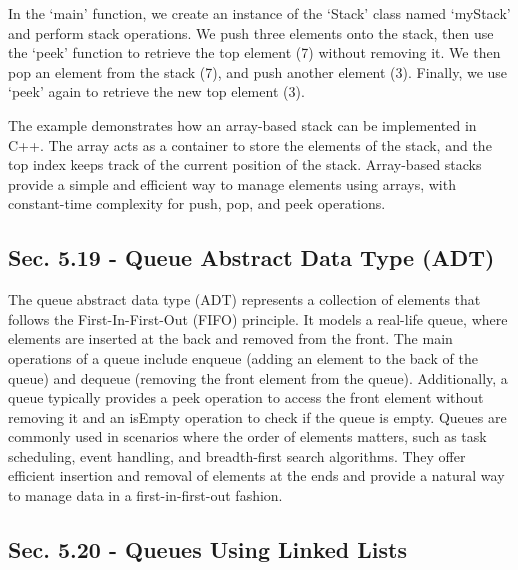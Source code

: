 \begin{solution}
    In the `main' function, we create an instance of the `Stack' class named `myStack' and perform stack operations. We push three elements onto the stack, then use the `peek' function to retrieve the top element (7) without removing it. We then pop an element from the stack (7), and push another element (3). Finally, we use `peek' again to retrieve the new top element (3).

    The example demonstrates how an array-based stack can be implemented in C++. The array acts as a container to store the elements of the stack, and the top index keeps track of the current position of the stack. Array-based stacks provide a simple and efficient way to manage elements using arrays, with constant-time complexity for push, pop, and peek operations.
\end{solution}

\subsection*{Sec. 5.19 - Queue Abstract Data Type (ADT)}

The queue abstract data type (ADT) represents a collection of elements that follows the First-In-First-Out (FIFO) principle. It models a real-life queue, where elements are inserted at the back and removed from the front. The main operations of a queue include enqueue (adding an element to the back of the queue) and dequeue (removing the front element from the queue). Additionally, 
a queue typically provides a peek operation to access the front element without removing it and an isEmpty operation to check if the queue is empty. Queues are commonly used in scenarios where the order of elements matters, such as task scheduling, event handling, and breadth-first search algorithms. They offer efficient insertion and removal of elements at the ends and provide a 
natural way to manage data in a first-in-first-out fashion.

\subsection*{Sec. 5.20 - Queues Using Linked Lists}


